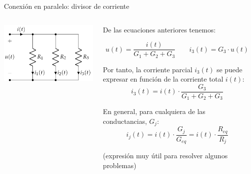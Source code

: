 \documentclass[aspectratio=169, xcolor={usenames,svgnames,dvipsnames}]{beamer}
\begin{document}
\begin{frame}{Conexión en paralelo: \hspace{2mm} divisor de corriente}
    \begin{columns}
    \begin{column}{0.4\columnwidth}
        \vspace{-10mm}
        \begin{center}
        \includegraphics[width=1\linewidth]{../figs/AsociacionParalelo.pdf}
        \end{center}
    \end{column}
    \begin{column}{0.6\columnwidth}
    
        \vspace{2mm}
        De las ecuaciones anteriores tenemos:
        
        \begin{equation*}
          u(t) = \frac{i(t)}{G_1 + G_2 + G_3} \qquad
          i_3(t) = G_3 \cdot u(t)
        \end{equation*}
        
        Por tanto, la \alert{corriente parcial} \(i_3(t)\) se puede expresar en función de la corriente total \(i(t)\): 
        \begin{equation*}
          i_3(t) = i(t) \cdot \frac{G_3}{G_1 + G_2 + G_3}  
        \end{equation*}
        
        \alert{En general}, para cualquiera de las conductancias, $G_j$:
        \begin{equation*}
          \boxed{i_j(t) = i(t) \cdot \frac{G_j}{G_{eq}} = i(t) \cdot \frac{R_{eq}}{R_j}}
        \end{equation*}

        \vspace{-1mm}
        \centering \small{(expresión muy útil para resolver algunos problemas)}
    \end{column}
    \end{columns}    
\end{frame}
\end{document}
